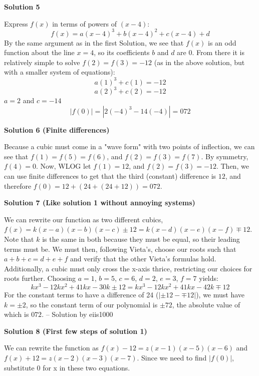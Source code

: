 \begin{enumerate}
 


 



\textbf{Solution 5}

Express $f(x)$ in terms of powers of $(x-4)$:
 \[f(x) = a(x-4)^3 + b(x-4)^2 + c(x-4) + d\]By the same argument as in the first Solution, we see that $f(x)$ is an odd function about the line $x=4$, so its coefficients $b$ and $d$ are 0. From there it is relatively simple to solve $f(2)=f(3)=-12$ (as in the above solution, but with a smaller system of equations):
 \[a(1)^3 + c(1) = -12\]
 \[a(2)^3 + c(2) = -12\]$a=2$ and $c=-14$
 \[|f(0)| = |2(-4)^3 - 14(-4)| = \boxed{072}\]




\textbf{Solution 6 (Finite differences)}

Because a cubic must come in a "wave form" with two points of inflection, we can see that $f(1)=f(5)=f(6)$, and $f(2)=f(3)=f(7)$. By symmetry, $f(4)=0$. Now, WLOG let $f(1)=12$, and $f(2)=f(3)=-12$. Then, we can use finite differences to get that the third (constant) difference is $12$, and therefore $f(0)=12+(24+(24+12))=\boxed{072}$.

 



\textbf{Solution 7 (Like solution 1 without annoying systems)}

We can rewrite our function as two different cubics, $f(x)=k(x-a)(x-b)(x-c)\pm12=k(x-d)(x-e)(x-f)\mp12$. Note that $k$ is the same in both because they must be equal, so their leading terms must be. We must then, following Vieta's, choose our roots such that $a+b+c=d+e+f$ and verify that the other Vieta's formulas hold. Additionally, a cubic must only cross the x-axis thrice, restricting our choices for roots further. Choosing $a=1$, $b=5$, $c=6$, $d=2$, $e=3$, $f=7$ yields: 
 \[kx^3-12kx^2+41kx-30k\pm12=kx^3-12kx^2+41kx-42k\mp12\] For the constant terms to have a difference of 24 ($|\pm12-\mp12|$), we must have $k=\pm2$, so the constant term of our polynomial is $\pm72$, the absolute value of which is $\boxed{072}$. -- Solution by eiis1000

 


 



\textbf{Solution 8 (First few steps of solution 1)}

We can rewrite the function as $f(x) - 12 = z(x-1)(x-5)(x-6)$ and $f(x) + 12 = z(x-2)(x-3)(x-7)$. Since we need to find $|f(0)|$, substitute 0 for x in these two equations. 


\end{enumerate}
